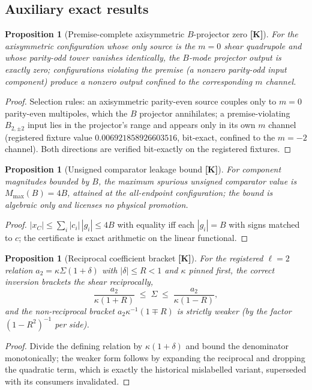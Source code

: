 \documentclass[10pt]{article}
\newtheorem{proposition}[theorem]{Proposition}
\theoremstyle{definition}
\newcommand{\tier}[1]{\textbf{[#1]}}
\begin{document}
\subsection{Auxiliary exact results}

\begin{proposition}[Premise-complete axisymmetric $B$-projector zero
\tier{K}]
For the axisymmetric configuration whose only source is the $m=0$
shear quadrupole and whose parity-odd tower vanishes identically, the
$B$-mode projector output is exactly zero; configurations violating
the premise (a nonzero parity-odd input component) produce a nonzero
output confined to the corresponding $m$ channel.
\end{proposition}
\begin{proof}
Selection rules: an axisymmetric parity-even source couples only to
$m = 0$ parity-even multipoles, which the $B$ projector annihilates;
a premise-violating $B_{2,\pm2}$ input lies in the projector's range
and appears only in its own $m$ channel (registered fixture value
$0.006921858926603516$, bit-exact, confined to the $m = -2$ channel).
Both directions are verified bit-exactly on the registered fixtures.
\end{proof}

\begin{proposition}[Unsigned comparator leakage bound \tier{K}]
For component magnitudes bounded by $B$, the maximum spurious unsigned
comparator value is $M_{\max}(B) = 4B$, attained at the all-endpoint
configuration; the bound is algebraic only and licenses no physical
promotion.
\end{proposition}
\begin{proof}
$|x_C| \le \sum_i |c_i|\, |g_i| \le 4B$ with equality iff each
$|g_i| = B$ with signs matched to $c$; the certificate is exact
arithmetic on the linear functional.
\end{proof}

\begin{proposition}[Reciprocal coefficient bracket \tier{K}]
\label{prop:recbracket}
For the registered $\ell = 2$ relation $a_2 = \kappa\Sigma(1+\delta)$
with $|\delta| \le R < 1$ and $\kappa$ pinned first, the correct
inversion brackets the shear \emph{reciprocally},
\begin{equation}
\frac{a_2}{\kappa(1+R)} \;\le\; \Sigma \;\le\; \frac{a_2}{\kappa(1-R)},
\end{equation}
and the non-reciprocal bracket $a_2\kappa^{-1}(1 \mp R)$ is strictly
weaker (by the factor $(1-R^2)^{-1}$ per side).
\end{proposition}
\begin{proof}
Divide the defining relation by $\kappa(1+\delta)$ and bound the
denominator monotonically; the weaker form follows by expanding the
reciprocal and dropping the quadratic term, which is exactly the
historical mislabelled variant, superseded with its consumers
invalidated.
\end{proof}
\end{document}
